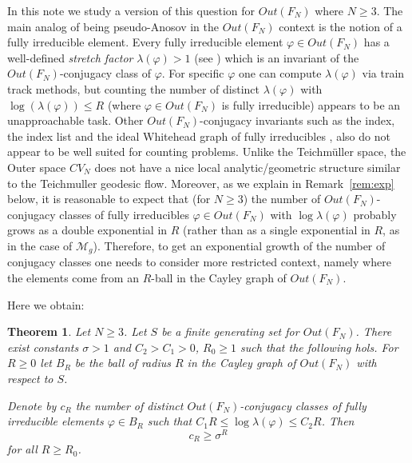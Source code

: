 \documentclass[11pt,letterpaper]{amsart}
\newtheorem{thm}{Theorem}[section]
\theoremstyle{definition}
\theoremstyle{remark}
\renewcommand{\phi}{\varphi}
\begin{document}
In this note we study a version of this question for $Out(F_N)$ where $N\ge 3$.  The main analog of being pseudo-Anosov in the $Out(F_N)$ context is the notion of a fully irreducible element.  Every fully irreducible element $\phi\in Out(F_N)$ has a well-defined \emph{stretch factor} $\lambda(\phi)>1$ (see \cite{BH}) which is an invariant of the $Out(F_N)$-conjugacy class of $\phi$. For specific $\phi$ one can compute $\lambda(\phi)$ via train track methods, but counting the number of distinct $\lambda(\phi)$ with $\log(\lambda(\phi))\le R$ (where $\phi\in Out(F_N)$ is fully irreducible) appears to be an unapproachable task.  Other $Out(F_N)$-conjugacy invariants such as the index, the index list and the ideal Whitehead graph of fully irreducibles \cite{CH,CM,HM1,P}, also do not appear to be well suited for counting problems. Unlike the Teichm\"uller space, the Outer space $CV_N$ does not have a nice local analytic/geometric structure similar to the Teichmuller geodesic flow. Moreover, as we explain in  Remark~\ref{rem:exp} below, it is reasonable to expect that (for $N\ge 3$) the number of $Out(F_N)$-conjugacy classes of fully irreducibles $\phi\in Out(F_N)$  with $\log\lambda(\phi)$ probably grows as a double exponential in $R$ (rather than as a single exponential in $R$, as in the case of $\mathcal M_g$). Therefore, to get an exponential growth of the number of conjugacy classes one needs to consider more restricted context, namely where the elements come from an $R$-ball in the Cayley graph of $Out(F_N)$. 

Here we obtain:

\begin{thm}\label{thm:A}
Let $N\ge 3$.  Let $S$ be a finite generating set for $Out(F_N)$.
There exist constants $\sigma>1$ and $C_2>C_1>0$, $R_0\ge 1$ such that the following hols.
For $R\ge 0$ let $B_R$ be the ball of radius $R$ in the Cayley graph of $Out(F_N)$ with respect to $S$.

Denote by $c_R$ the number of distinct $Out(F_N)$-conjugacy classes of fully irreducible elements $\phi\in B_R$ such that $C_1R\le \log\lambda(\phi)\le C_2 R$.
Then
\[
c_R\ge \sigma^R
\]
for all $R\ge R_0$.
\end{thm}
\end{document}
